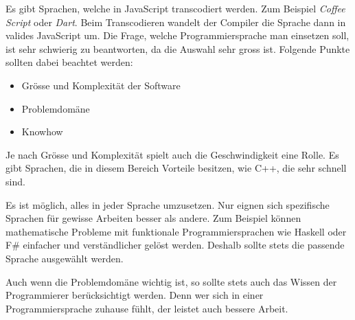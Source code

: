 Es gibt Sprachen, welche in JavaScript transcodiert werden. Zum Beispiel \textit{Coffee Script} oder \textit{Dart}. Beim Transcodieren wandelt der Compiler die Sprache dann in valides JavaScript um.
Die Frage, welche Programmiersprache man einsetzen soll, ist sehr schwierig zu beantworten, da die Auswahl sehr gross ist. Folgende Punkte sollten dabei beachtet werden:
\begin{itemize}
\item Grösse und Komplexität der Software
\item Problemdomäne
\item Knowhow
\end{itemize}
Je nach Grösse und Komplexität spielt auch die Geschwindigkeit eine Rolle. Es gibt Sprachen, die in diesem Bereich Vorteile besitzen, wie C++, die sehr schnell sind.

Es ist möglich, alles in jeder Sprache umzusetzen. Nur eignen sich spezifische Sprachen für gewisse Arbeiten besser als andere. Zum Beispiel können mathematische Probleme mit funktionale Programmiersprachen wie Haskell oder F\# einfacher und verständlicher gelöst werden. Deshalb sollte stets die passende Sprache ausgewählt werden.

Auch wenn die Problemdomäne wichtig ist, so sollte stets auch das Wissen der Programmierer berücksichtigt werden. Denn wer sich in einer Programmiersprache zuhause fühlt, der leistet auch bessere Arbeit.
